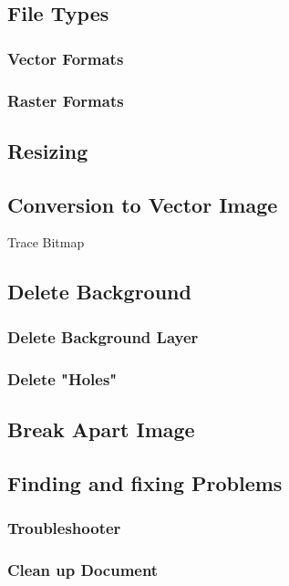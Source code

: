 \documentclass{article}
\begin{document}
        \subsection{File Types}
            \subsubsection{Vector Formats}
            \subsubsection{Raster Formats}
        
        \subsection{Resizing}
        
        \subsection{Conversion to Vector Image}
        Trace Bitmap    

        \subsection{Delete Background}
        \subsubsection{Delete Background Layer}
        \subsubsection{Delete "Holes"}        
        
        \subsection{Break Apart Image}

        \subsection{Finding and fixing Problems}
            \subsubsection{Troubleshooter}
            \subsubsection{Clean up Document}
\end{document}
